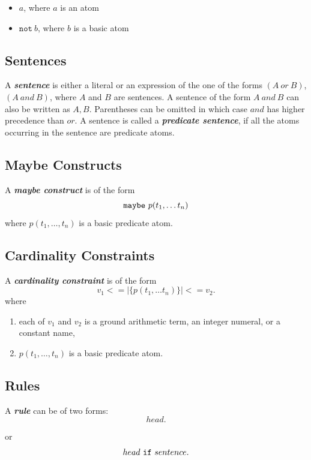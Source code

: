 \documentclass[a4paper,10pt]{article}
\begin{document}
\begin{itemize}
\item $a$, where $a$ is an atom
\item $\texttt{not}~b$, where $b$ is a basic atom
\end{itemize}


\subsection{Sentences}\label{sentsec}

A \textit{\textbf{sentence}} is either a literal or an expression of the one of the forms  $(A~or~B)$, $(A~and~B)$, where $A$ and $B$ are sentences. A sentence of the form $A~and~B$
can also be written as $A, B$. Parentheses can be omitted in which case $and$ has higher precedence than $or$. A sentence is called a \textbf{\textit{predicate sentence}}, if all the atoms occurring in the sentence are predicate atoms.

\subsection{Maybe Constructs}

A \textbf{\textit{maybe construct}} is of the form $$\mbox{\texttt{maybe}}~p(t_1,\ldots t_n)$$ where $p(t_1,\ldots,t_n)$ is a basic predicate atom.

\subsection{Cardinality Constraints}

A \textit{\textbf{cardinality constraint}} is of the form 
$$v_1 <= |\{p(t_1,\ldots t_n)\}| <= v_2.$$
where
\begin{enumerate}
\item each of $v_1$ and $v_2$ is a ground arithmetic term, an integer numeral, or a constant name, 
\item $p(t_1,\ldots,t_n)$ is a basic predicate atom.
\end{enumerate}
\subsection{Rules} \label{rl}

A \textit{\textbf{rule}} can be of two forms:
\begin{equation}\label{eq1}
  head. 
\end{equation}

\noindent
or 
\begin{equation}
head~\mbox{\texttt{if}}~sentence.
\end{equation}
\end{document}
